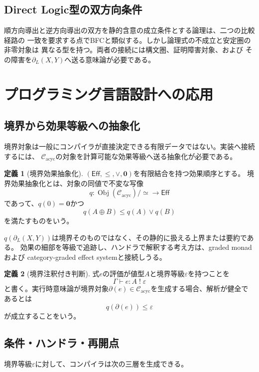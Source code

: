 \documentclass[11pt,a4paper]{ltjsarticle}
\theoremstyle{definition}
\newtheorem{definition}{定義}[section]
\theoremstyle{remark}
\newcommand{\Cacyc}{\mathcal{C}_{\mathrm{acyc}}}
\newcommand{\Boundary}{\partial_L}
\newcommand{\Eff}{\mathsf{Eff}}
\begin{document}
\subsection{Direct Logic型の双方向条件}

順方向導出と逆方向導出の双方を静的含意の成立条件とする論理は、二つの比較経路の
一致を要求する点でBFCと類似する。しかし論理式の不成立と安定圏の非零対象は
異なる型を持つ。両者の接続には構文圏、証明障害対象、および
その障害を$\Boundary(X,Y)$へ送る意味論が必要である。

\section{プログラミング言語設計への応用}

\subsection{境界から効果等級への抽象化}

境界対象は一般にコンパイラが直接決定できる有限データではない。実装へ接続するには、
$\Cacyc$の対象を計算可能な効果等級へ送る抽象化が必要である。

\begin{definition}[境界効果抽象化]
$(\Eff,\leq,\vee,\mathbf{0})$を有限結合を持つ効果順序とする。
境界効果抽象化とは、対象の同値で不変な写像
\[
 q:\operatorname{Obj}(\Cacyc)/{\simeq}\longrightarrow\Eff
\]
であって、$q(0)=\mathbf{0}$かつ
\[
 q(A\oplus B)\leq q(A)\vee q(B)
\]
を満たすものをいう。
\end{definition}

$q(\Boundary(X,Y))$は境界そのものではなく、その静的に扱える上界または要約である。
効果の細部を等級で追跡し、ハンドラで解釈する考え方は、graded monadおよび
category-graded effect systemと接続しうる\cite{OrchardWadlerEades2020,Sanada2023}。

\begin{definition}[境界注釈付き判断]
式$e$の評価が値型$A$と境界等級$\varepsilon$を持つことを
\[
 \Gamma\vdash e:A\;!\;\varepsilon
\]
と書く。実行時意味論が境界対象$\partial(e)\in\Cacyc$を生成する場合、解析が健全であるとは
\[
 q(\partial(e))\leq\varepsilon
\]
が成立することをいう。
\end{definition}

\subsection{条件・ハンドラ・再開点}

境界等級$\varepsilon$に対して、コンパイラは次の三層を生成できる。
\end{document}
